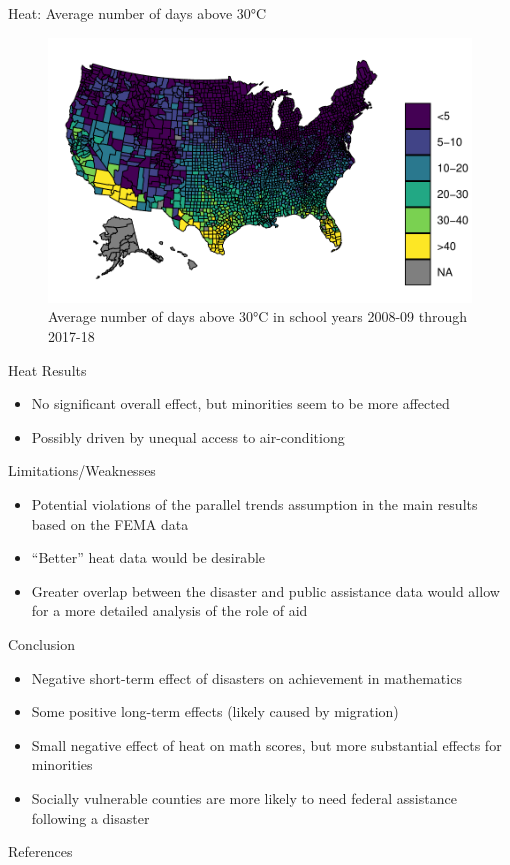 \documentclass[hyperref={colorlinks = true,linkcolor = blue, citecolor=blue,urlcolor=blue}]{beamer}
\begin{document}
\begin{frame}{Heat: Average number of days above 30°C}
	\begin{figure}[!h]
		\centering
		\includegraphics[scale=0.65]{"../Code & Data/HeatMapDays.pdf"}
		\caption{Average number of days above 30°C in school years 2008-09 through 2017-18}
		\label{HeatMapDays}
	\end{figure}
\end{frame}

\begin{frame}{Heat Results}
	\begin{itemize}
		\item No significant overall effect, but minorities seem to be more affected
		\item Possibly driven by unequal access to air-conditiong \citep{Goodman_2020}
	\end{itemize}
	
\end{frame}

\begin{frame}{Limitations/Weaknesses}
	\begin{itemize}
		\item Potential violations of the parallel trends assumption in the main results based on the FEMA data
		\item ``Better'' heat data would be desirable
		\item Greater overlap between the disaster and public assistance data would allow for a more detailed analysis of the role of aid
	\end{itemize}
\end{frame}

\begin{frame}{Conclusion}
	\begin{itemize}
		\item Negative short-term effect of disasters on achievement in mathematics
		\item Some positive long-term effects (likely caused by migration)
		\item Small negative effect of heat on math scores, but more substantial effects for minorities
		\item Socially vulnerable counties are more likely to need federal assistance following a disaster
	\end{itemize}
\end{frame}



\begin{frame}{References}
	
	
\end{frame}
\end{document}
